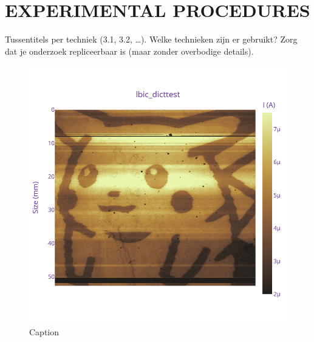 \section{EXPERIMENTAL PROCEDURES}
Tussentitels per techniek (3.1, 3.2, \dots).
Welke technieken zijn er gebruikt?
Zorg dat je onderzoek repliceerbaar is (maar zonder overbodige details).
\begin{figure}[H]
    \centering
    \includegraphics[width=\linewidth]{Figures/newplot(4).png}
    \caption{Caption}
    \label{fig:my_label}
\end{figure}